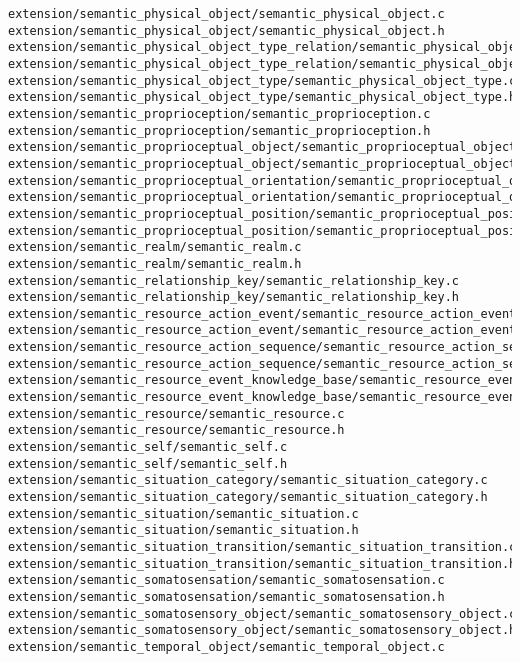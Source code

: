 \begin{lstlisting}
extension/semantic_physical_object/semantic_physical_object.c
extension/semantic_physical_object/semantic_physical_object.h
extension/semantic_physical_object_type_relation/semantic_physical_object_type_relation.c
extension/semantic_physical_object_type_relation/semantic_physical_object_type_relation.h
extension/semantic_physical_object_type/semantic_physical_object_type.c
extension/semantic_physical_object_type/semantic_physical_object_type.h
extension/semantic_proprioception/semantic_proprioception.c
extension/semantic_proprioception/semantic_proprioception.h
extension/semantic_proprioceptual_object/semantic_proprioceptual_object.c
extension/semantic_proprioceptual_object/semantic_proprioceptual_object.h
extension/semantic_proprioceptual_orientation/semantic_proprioceptual_orientation.c
extension/semantic_proprioceptual_orientation/semantic_proprioceptual_orientation.h
extension/semantic_proprioceptual_position/semantic_proprioceptual_position.c
extension/semantic_proprioceptual_position/semantic_proprioceptual_position.h
extension/semantic_realm/semantic_realm.c
extension/semantic_realm/semantic_realm.h
extension/semantic_relationship_key/semantic_relationship_key.c
extension/semantic_relationship_key/semantic_relationship_key.h
extension/semantic_resource_action_event/semantic_resource_action_event.c
extension/semantic_resource_action_event/semantic_resource_action_event.h
extension/semantic_resource_action_sequence/semantic_resource_action_sequence.c
extension/semantic_resource_action_sequence/semantic_resource_action_sequence.h
extension/semantic_resource_event_knowledge_base/semantic_resource_event_knowledge_base.c
extension/semantic_resource_event_knowledge_base/semantic_resource_event_knowledge_base.h
extension/semantic_resource/semantic_resource.c
extension/semantic_resource/semantic_resource.h
extension/semantic_self/semantic_self.c
extension/semantic_self/semantic_self.h
extension/semantic_situation_category/semantic_situation_category.c
extension/semantic_situation_category/semantic_situation_category.h
extension/semantic_situation/semantic_situation.c
extension/semantic_situation/semantic_situation.h
extension/semantic_situation_transition/semantic_situation_transition.c
extension/semantic_situation_transition/semantic_situation_transition.h
extension/semantic_somatosensation/semantic_somatosensation.c
extension/semantic_somatosensation/semantic_somatosensation.h
extension/semantic_somatosensory_object/semantic_somatosensory_object.c
extension/semantic_somatosensory_object/semantic_somatosensory_object.h
extension/semantic_temporal_object/semantic_temporal_object.c

\end{lstlisting}
